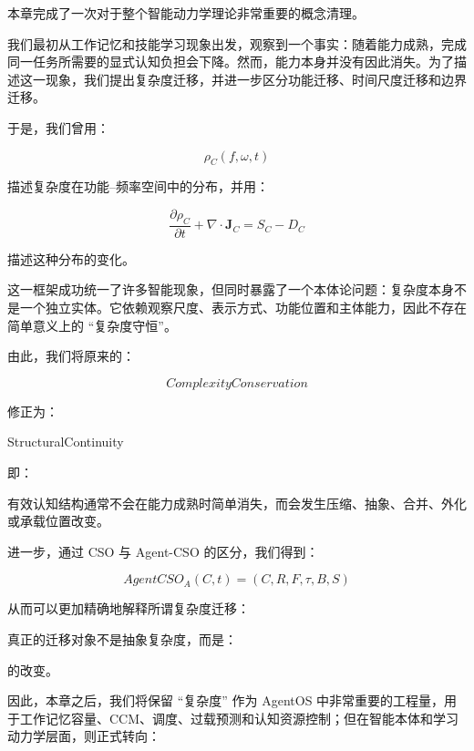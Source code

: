 本章完成了一次对于整个智能动力学理论非常重要的概念清理。

我们最初从工作记忆和技能学习现象出发，观察到一个事实：随着能力成熟，完成同一任务所需要的显式认知负担会下降。然而，能力本身并没有因此消失。为了描述这一现象，我们提出复杂度迁移，并进一步区分功能迁移、时间尺度迁移和边界迁移。

于是，我们曾用：

\[
\rho_C(f,\omega,t)
\]

描述复杂度在功能--频率空间中的分布，并用：

\[
\frac{\partial \rho_C}{\partial t}
+
\nabla\cdot\mathbf J_C
=
S_C-D_C
\]

描述这种分布的变化。

这一框架成功统一了许多智能现象，但同时暴露了一个本体论问题：复杂度本身不是一个独立实体。它依赖观察尺度、表示方式、功能位置和主体能力，因此不存在简单意义上的 ``复杂度守恒''。

由此，我们将原来的：

\[
ComplexityConservation
\]

修正为：

\begin{statementbox}
StructuralContinuity
\end{statementbox}

即：

\begin{statementbox}
有效认知结构通常不会在能力成熟时简单消失，而会发生压缩、抽象、合并、外化或承载位置改变。
\end{statementbox}

进一步，通过 CSO 与 Agent-CSO 的区分，我们得到：

\[
AgentCSO_A(C,t)
=
(C,R,F,\tau,B,S)
\]

从而可以更加精确地解释所谓复杂度迁移：

\begin{statementbox}
\centering
{}
\end{statementbox}

真正的迁移对象不是抽象复杂度，而是：

\begin{statementbox}
\centering
{}
\end{statementbox}

的改变。

因此，本章之后，我们将保留 ``复杂度'' 作为 AgentOS 中非常重要的工程量，用于工作记忆容量、CCM、调度、过载预测和认知资源控制；但在智能本体和学习动力学层面，则正式转向：

